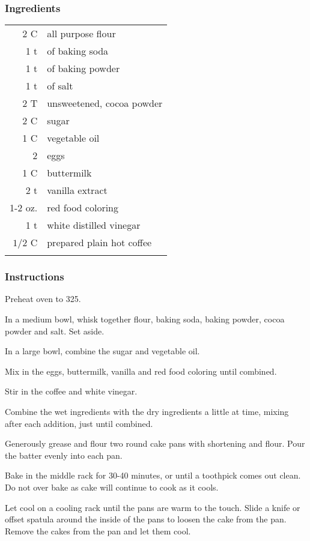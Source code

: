 \documentclass[12pt,landscape,twoside,twocolumn, openright, titlepage, draft]{book}
\begin{document}
\subsubsection{Ingredients}
\begin{tabular}{r p{1.5in}}
  2 C & all purpose flour \\
  1 t & of baking soda \\
  1 t & of baking powder \\
  1 t & of salt \\
  2 T & unsweetened, cocoa powder  \\
  2 C & sugar \\
  1 C & vegetable oil  \\
  2   & eggs \\
  1 C & buttermilk \\
  2 t & vanilla extract \\
  1-2 oz. & red food coloring \\
  1 t     & white distilled vinegar \\
  $1/2$ C & prepared plain hot coffee \\ \\
\end{tabular}
\subsubsection{Instructions}

Preheat oven to 325.

In a medium bowl, whisk together flour, baking soda, baking powder,
cocoa powder and salt. Set aside.

In a large bowl, combine the sugar and vegetable oil.

Mix in the eggs, buttermilk, vanilla and red food coloring until combined.

Stir in the coffee and white vinegar.

Combine the wet ingredients with the dry ingredients a little at time,
mixing after each addition, just until combined.

Generously grease and flour two round cake pans with shortening and flour.
Pour the batter evenly into each pan.

Bake in the middle rack for 30-40 minutes, or until a toothpick comes
out clean. Do not over bake as cake will continue to cook as it cools.

Let cool on a cooling rack until the pans are warm to the touch.
Slide a knife or offset spatula around the inside of the pans to
loosen the cake from the pan.  Remove the cakes from the pan and let
them cool.  
\end{document}
